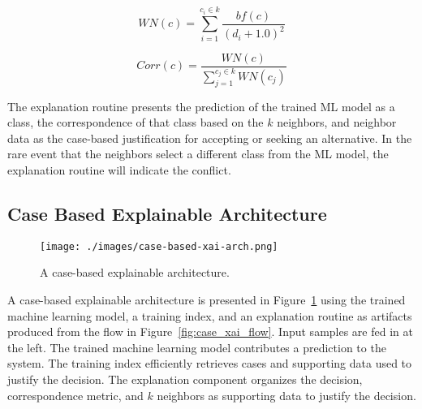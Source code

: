 \begin{equation}\label{eq:weight_of_neighbors}
    WN(c) = \sum_{i=1}^{c_i \in k} \frac{bf(c)}{(d_i+1.0)^2} 
\end{equation}

\begin{equation}\label{eq:correspondence}
    Corr(c) = \frac{WN(c)}{\sum_{j=1}^{c_j \in k}{WN(c_j)}} 
\end{equation}

The explanation routine presents the prediction of the trained ML model as a
class, the correspondence of that class based on the $k$ neighbors, and neighbor
data as the case-based justification for accepting or seeking an alternative. In
the rare event that the neighbors select a different class from the ML model,
the explanation routine will indicate the conflict.

\subsection{Case Based Explainable Architecture}

\begin{figure}[h]
    \centering
    \texttt{[image: ./images/case-based-xai-arch.png]}
    \caption{A case-based explainable architecture.}
    \label{fig:case_xai_arch}
\end{figure}

A case-based explainable architecture is presented in
Figure~\ref{fig:case_xai_arch} using the trained machine learning model, a
training index, and an explanation routine as artifacts produced from the flow
in Figure~\ref{fig:case_xai_flow}. Input samples are fed in at the left. The
trained machine learning model contributes a prediction to the system. The
training index efficiently retrieves cases and supporting data used to justify
the decision. The explanation component organizes the decision, correspondence
metric, and $k$ neighbors as supporting data to justify the decision.

